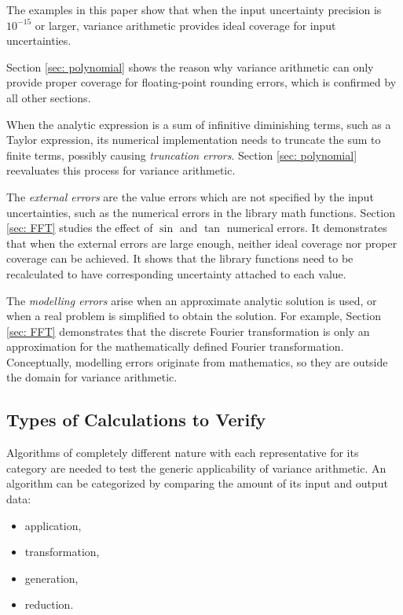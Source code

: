 \documentclass[twoside]{article}
\numberwithin{equation}{section}
\begin{document}
The examples in this paper show that when the input uncertainty precision is $10^{-15}$ or larger, variance arithmetic provides ideal coverage for input uncertainties.

Section \ref{sec: polynomial} shows the reason why variance arithmetic can only provide proper coverage for floating-point rounding errors, which is confirmed by all other sections.

When the analytic expression is a sum of infinitive diminishing terms, such as a Taylor expression, its numerical implementation needs to truncate the sum to finite terms, possibly causing \emph{truncation errors}.
Section \ref{sec: polynomial} reevaluates this process for variance arithmetic. 

The \emph{external errors} are the value errors which are not specified by the input uncertainties, such as the numerical errors in the library math functions.
Section \ref{sec: FFT} studies the effect of $\sin$ and $\tan$ numerical errors.
It demonstrates that when the external errors are large enough, neither ideal coverage nor proper coverage can be achieved.
It shows that the library functions need to be recalculated to have corresponding uncertainty attached to each value.

The \emph{modelling errors} arise when an approximate analytic solution is used, or when a real problem is simplified to obtain the solution.  
For example, Section \ref{sec: FFT} demonstrates that the discrete Fourier transformation is only an approximation for the mathematically defined Fourier transformation.  
Conceptually, modelling errors originate from mathematics, so they are outside the domain for variance arithmetic.


\subsection{Types of Calculations to Verify \cite{Prev_Precision_Arithmetic}}

Algorithms of completely different nature with each representative for its category are needed to test the generic applicability of variance arithmetic.  
An algorithm can be categorized by comparing the amount of its input and output data:
\begin{itemize}
\item application,
\item transformation,
\item generation,
\item reduction.
\end{itemize}
\end{document}
